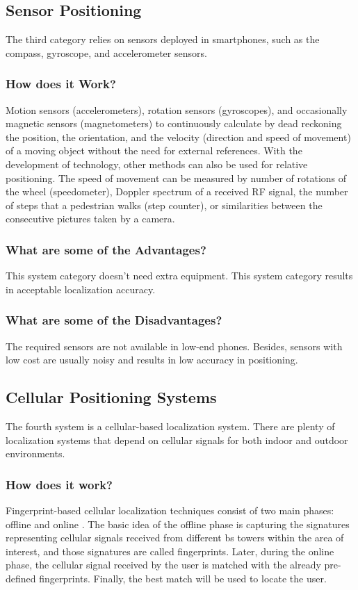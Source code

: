 \subsection{Sensor Positioning}
The third category relies on sensors deployed in smartphones, such as the compass, gyroscope, and accelerometer sensors.

\subsubsection{How does it Work?}
Motion sensors (accelerometers), rotation sensors (gyroscopes), and occasionally magnetic sensors (magnetometers) to continuously calculate by dead reckoning the position, the orientation, and the velocity (direction and speed of movement) of a moving object without the need for external references.
With the development of technology, other methods can also be used for relative positioning.
The speed of movement can be measured by number of rotations of the wheel (speedometer), Doppler spectrum of a received RF signal, the number of steps that a pedestrian walks (step counter), or similarities between the consecutive pictures taken by a camera.\cite{Ying19}

\subsubsection{What are some of the Advantages?}
This system category doesn't need extra equipment.
This system category results in acceptable localization accuracy.

\subsubsection{What are some of the Disadvantages?}
The required sensors are not available in low-end phones.
Besides, sensors with low cost are usually noisy and results in low accuracy in positioning.

\subsection{Cellular Positioning Systems}
The fourth system is a cellular-based localization system.
There are plenty of localization systems that depend on cellular signals for both indoor and outdoor environments.

\subsubsection{How does it work?}
Fingerprint-based cellular localization techniques consist of two main phases: offline and online \cite{6062428}.
The basic idea of the offline phase is capturing the signatures representing cellular signals received from different \ac{bs} towers within the area of interest, and those signatures are called fingerprints. Later, during the online phase, the cellular signal received by the user is matched with the already pre-defined fingerprints. Finally, the best match will be used to locate the user.

